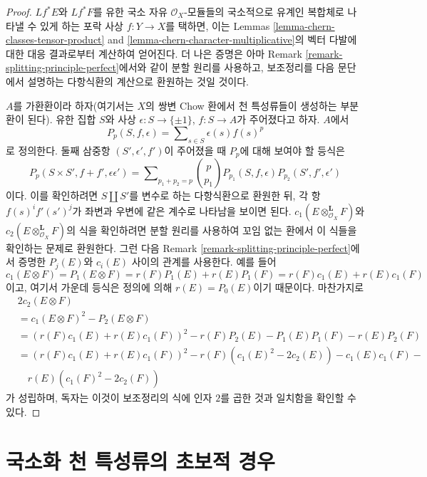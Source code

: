 \begin{proof}
$Lf^*E$와 $Lf^*F$를 유한 국소 자유 $\mathcal{O}_X$-모듈들의
국소적으로 유계인 복합체로 나타낼 수 있게 하는 포락 사상
$f : Y \to X$를 택하면, 이는 Lemmas
\ref{lemma-chern-classes-tensor-product} and
\ref{lemma-chern-character-multiplicative}의 벡터 다발에 대한 대응
결과로부터 계산하여 얻어진다. 더 나은 증명은 아마 Remark
\ref{remark-splitting-principle-perfect}에서와 같이 분할 원리를
사용하고, 보조정리를 다음 문단에서 설명하는 다항식환의 계산으로
환원하는 것일 것이다.

\medskip\noindent
$A$를 가환환이라 하자(여기서는 $X$의 쌍변 Chow 환에서 천 특성류들이
생성하는 부분환이 된다). 유한 집합 $S$와 사상
$\epsilon : S \to \{\pm 1\}$, $f : S \to A$가 주어졌다고 하자.
$A$에서
$$
P_p(S, f , \epsilon) = \sum\nolimits_{s \in S} \epsilon(s) f(s)^p
$$
로 정의한다. 둘째 삼중항 $(S', \epsilon', f')$이 주어졌을 때
$P_p$에 대해 보여야 할 등식은
$$
P_p(S \times S', f + f' , \epsilon \epsilon') = 
\sum\nolimits_{p_1 + p_2 = p}
{p \choose p_1} P_{p_1}(S, f, \epsilon) P_{p_2}(S', f', \epsilon')
$$
이다. 이를 확인하려면 $S \amalg S'$를 변수로 하는 다항식환으로
환원한 뒤, 각 항 $f(s)^if'(s')^j$가 좌변과 우변에 같은 계수로
나타남을 보이면 된다. $c_1(E \otimes_{\mathcal{O}_X}^\mathbf{L} F)$와
$c_2(E \otimes_{\mathcal{O}_X}^\mathbf{L} F)$의 식을 확인하려면
분할 원리를 사용하여 꼬임 없는 환에서 이 식들을 확인하는 문제로
환원한다. 그런 다음 Remark \ref{remark-splitting-principle-perfect}에서
증명한 $P_j(E)$와 $c_i(E)$ 사이의 관계를 사용한다. 예를 들어
$$
c_1(E \otimes F) = P_1(E \otimes F) = r(F)P_1(E) + r(E)P_1(F) =
r(F)c_1(E) + r(E)c_1(F)
$$
이고, 여기서 가운데 등식은 정의에 의해 $r(E) = P_0(E)$이기 때문이다.
마찬가지로
\begin{align*}
& 2c_2(E \otimes F) \\
& = c_1(E \otimes F)^2 - P_2(E \otimes F) \\
& =
(r(F)c_1(E) + r(E)c_1(F))^2 -
r(F)P_2(E) - P_1(E)P_1(F) - r(E)P_2(F) \\
& =
(r(F)c_1(E) + r(E)c_1(F))^2 -
r(F)(c_1(E)^2 - 2c_2(E)) - c_1(E)c_1(F) - \\
& \quad r(E)(c_1(F)^2 - 2c_2(F))
\end{align*}
가 성립하며, 독자는 이것이 보조정리의 식에 인자 $2$를 곱한 것과
일치함을 확인할 수 있다.
\end{proof}







\section{국소화 천 특성류의 초보적 경우}
\label{section-preparation-localized-chern}

